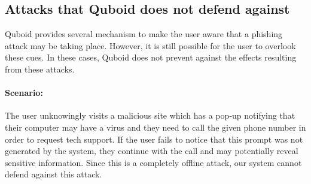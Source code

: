 







\subsection{Attacks that Quboid does not defend against}

Quboid provides several mechanism to make the user aware that a phishing attack may be taking place. However, it is still possible for the user to overlook these cues. In these cases, Quboid does not prevent against the effects resulting from these attacks.

\paragraph{Scenario:} The user unknowingly visits a malicious site which has a pop-up notifying that their computer may have a virus and they need to call the given phone number in order to request tech support. If the user fails to notice that this prompt was not generated by the system, they continue with the call and may potentially reveal sensitive information. Since this is a completely offline attack, our system cannot defend against this attack.

